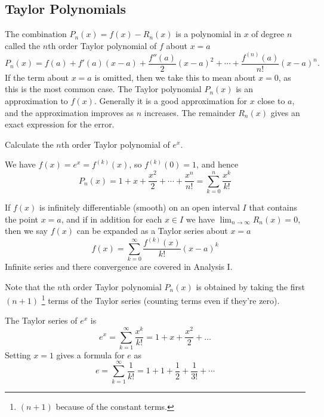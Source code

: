 \documentclass[10pt, a4paper]{article}
\begin{document}
\subsection{Taylor Polynomials}
The combination $P_n(x) = f(x) - R_n(x)$ is a polynomial in $x$ of degree $n$ called the $n$th order Taylor polynomial of $f$ about $x = a$
\[
P_n(x) = f(a) + f'(a)(x - a) + \frac{f''(a)}{2}(x - a) ^ 2 + \dotsi + \frac{f ^ {(n)}(a)}{n!}(x - a) ^ n.
\]
If the term about $x = a$ is omitted,
then we take this to mean about $x = 0$,
as this is the most common case.
The Taylor polynomial $P_n(x)$ is an approximation to $f(x)$.
Generally it is a good approximation for $x$ close to $a$,
and the approximation improves as $n$ increases.
The remainder $R_n(x)$ gives an exact expression for the error.

\begin{example}
    Calculate the $n$th order Taylor polynomial of $e ^ x$.

    We have $f(x) = e ^ x = f ^ {(k)}(x)$,
    so $f ^ {(k)}(0) = 1$,
    and hence
    \[
    P_n(x) = 1 + x + \frac{x ^ 2}{2} + \dotsi + \frac{x ^ n}{n!} = \sum_{k = 0}^{n}\frac{x ^ k}{k!}
    \]
\end{example}

If $f(x)$ is infinitely differentiable
(smooth)
on an open interval $I$ that contains the point $x = a$,
and if in addition for each $x \in I$ we have $\lim_{n \rightarrow \infty}R_n(x) = 0$,
then we say $f(x)$ can be expanded as a Taylor series about $x = a$
\[
f(x) = \sum_{k = 0}^{\infty}\frac{f ^ {(k)}(x)}{k!}(x - a) ^ k
\]
Infinite series and there convergence are covered in Analysis I.

Note that the $n$th order Taylor polynomial $P_n(x)$ is obtained by taking the first $(n + 1)$
\footnote{$(n + 1)$ because of the constant terms.}
terms of the Taylor series
(counting terms even if they're zero).

\begin{example}
    The Taylor series of $e ^ x$ is
    \[
    e ^ x = \sum_{k = 1}^{\infty}\frac{x ^ k}{k!} = 1 + x + \frac{x ^ 2}{2} + \dotsc
    \]
    Setting $x = 1$ gives a formula for $e$ as
    \[
    e = \sum_{k = 1}^{\infty}\frac{1}{k!} = 1 + 1 + \frac{1}{2} + \frac{1}{3!} + \dotsi
    \]
\end{example}
\end{document}
